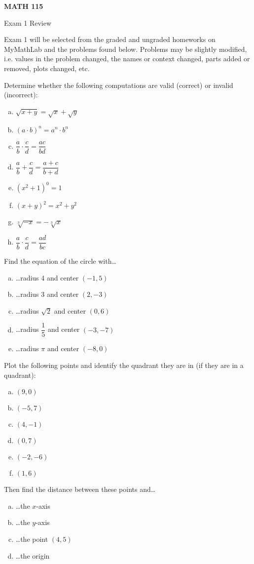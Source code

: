 \documentclass[11pt,letterpaper]{article}
\begin{document}
\begin{center} {\bfseries \Large MATH 115 \par\vspace{0.3cm} \LARGE Exam 1 Review} \end{center} \par\vspace{1cm}


Exam 1 will be selected from the graded and ungraded homeworks on MyMathLab and the problems found below. Problems may be slightly modified, i.e. values in the problem changed, the names or context changed, parts added or removed, plots changed, etc. \pspace


\prob Determine whether the following computations are valid (correct) or invalid (incorrect):
	\begin{enumerate}[(a)]
	\item $\sqrt{x + y}= \sqrt{x} + \sqrt{y}$
	\item $(a \cdot b)^n= a^n \cdot b^n$
	\item $\dfrac{a}{b} \cdot \dfrac{c}{d}= \dfrac{ac}{bd}$
	\item $\dfrac{a}{b} + \dfrac{c}{d}= \dfrac{a + c}{b + d}$
	\item $(x^2 + 1)^0= 1$
	\item $(x + y)^2= x^2 + y^2$
	\item $\sqrt[3]{-x}= -\sqrt[3]{x}$
	\item $\dfrac{a}{b} \cdot \dfrac{c}{d}= \dfrac{ad}{bc}$
	\end{enumerate} \pspace


\prob Find the equation of the circle with\dots
	\begin{enumerate}[(a)]
	\item \dots radius 4 and center $(-1, 5)$
	\item \dots radius 3 and center $(2, -3)$
	\item \dots radius $\sqrt{2}$ and center $(0, 6)$
	\item \dots radius $\dfrac{1}{5}$ and center $(-3, -7)$
	\item \dots radius $\pi$ and center $(-8, 0)$
	\end{enumerate} \pspace


\prob Plot the following points and identify the quadrant they are in (if they are in a quadrant):
	\begin{enumerate}[(a)]
	\item $(9, 0)$
	\item $(-5, 7)$
	\item $(4, -1)$
	\item $(0, 7)$
	\item $(-2, -6)$
	\item $(1, 6)$
	\end{enumerate}
Then find the distance between these points and\dots
	\begin{enumerate}[(a)]
	\item \dots the $x$-axis
	\item \dots the $y$-axis
	\item \dots the point $(4, 5)$
	\item \dots the origin
	\end{enumerate} \pspace
\end{document}
